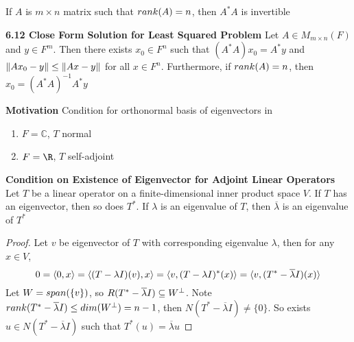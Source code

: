\documentclass[11pt]{article}
\begin{document}
\begin{corollary*}
    If $A$ is $m\times n$ matrix such that $rank(A)=n$, then $A^*A$ is invertible
\end{corollary*}


\begin{theorem*}
    \textbf{6.12 Close Form Solution for Least Squared Problem} Let $A\in M_{m\times n}(F)$ and $y\in F^m$. Then there exists $x_0\in F^n$ such that $(A^*A)x_0 = A^*y$ and $\left\lVert Ax_0 - y\right\rVert \leq \left\lVert Ax -y\right\rVert$ for all $x\in F^n$. Furthermore, if $rank(A)=n$, then $x_0 = (A^*A)^{-1}A^*y$ 
\end{theorem*}



\begin{defn*}
    \textbf{Motivation} Condition for orthonormal basis of eigenvectors in 
    \begin{enumerate}
        \item $F = \mathbb{C}$, $T$ normal
        \item $F = \R$, $T$ self-adjoint
    \end{enumerate}
\end{defn*}

\begin{lemma*}
    \textbf{Condition on Existence of Eigenvector for Adjoint Linear Operators} Let $T$ be a linear operator on a finite-dimensional inner product space $V$. If $T$ has an eigenvector, then so does $T^*$. If $\lambda$ is an eigenvalue of $T$, then $\overline{\lambda}$ is an eigenvalue of $T^*$
    \begin{proof}
        Let $v$ be eigenvector of $T$ with corresponding eigenvalue $\lambda$, then for any $x\in V$,
        \[
            0 = \langle0,x\rangle = \langle(T-\lambda I)(v),x\rangle = \langle v,(T - \lambda I)^*(x)\rangle = \langle v,(T^* - \overline{\lambda} I)(x)\rangle
        \]
        Let $W = span(\{v\})$, so $R(T^* - \overline{\lambda}I) \subseteq W^{\perp}$. Note $rank(T^*-\overline{\lambda}I) \leq dim(W^{\perp}) = n-1$, then $N(T^* - \overline{\lambda}I) \neq \{0\}$. So exists $u\in N(T^* - \overline{\lambda}I)$ such that $T^*(u) = \overline{\lambda}u$
    \end{proof}
\end{lemma*}
\end{document}
